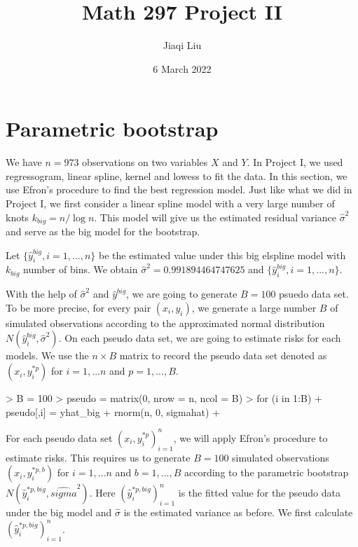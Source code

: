 \documentclass[12pt]{article}
\title{Math 297 Project II}
\author{Jiaqi Liu}\date{6 March 2022}
\begin{document}
\maketitle\thispagestyle{empty}


\section{Parametric bootstrap}
We have $n=973$ observations on two variables $X$ and $Y$. In Project I, we used regressogram, linear spline, kernel and lowess to fit the data. In this section, we use Efron's procedure to find the best regression model.  Just like what we did in Project I, we first consider a linear spline model with a very large number of knots $k_{big}=n/\log n$. This model will give us the estimated residual variance $\widehat{\sigma}^2$ and serve as the big model for the bootstrap.

Let $\{\widehat{y}_i^{big}, i=1,...,n\}$ be the estimated value under this big elspline model with $k_{big}$ number of bins. We obtain $\widehat\sigma^2 = 0.991894464747625$ and $\{\widehat{y}^{big}_i, i=1,...,n\}$. 


With the help of $\widehat{\sigma}^2$ and $\widehat{y}^{big}$, we are going to generate $B=100$ psuedo data set. To be more precise, for every pair $(x_i,y_i)$, we generate a large number $B$ of simulated observations according to the approximated normal distribution $N(\widehat{y}^{big}_i,\widehat\sigma^2)$. On each pseudo data set, we are going to estimate risks for each models. We use the $n\times B$ matrix to record the pseudo data set denoted as $(x_i, y_i^{*p})$ for $i=1,...n$ and $p=1,...,B$.
\begin{Schunk}
\begin{Sinput}
> B = 100
> pseudo = matrix(0, nrow = n, ncol = B)
> for (i in 1:B){
+   pseudo[,i] = yhat_big + rnorm(n, 0, sigmahat)
+ }
\end{Sinput}
\end{Schunk}
For each pseudo data set $(x_i, y_i^{*p})_{i=1}^{n}$, we will apply Efron's procedure to estimate risks. This requires us to generate $B=100$ simulated observations $(x_i, y_i^{*p,b})$ for $i=1,...n$ and $b=1,...,B$ according to the parametric bootstrap $N(\widehat{y}_i^{*p, big}, \widehat{sigma}^2)$. Here $(\widehat{y}_i^{*p,big})_{i=1}^{n}$ is the fitted value for the pseudo data under the big model and $\widehat{\sigma}$ is the estimated variance as before. We first calculate $(\widehat{y}_i^{*p,big})_{i=1}^{n}$.
\end{document}
